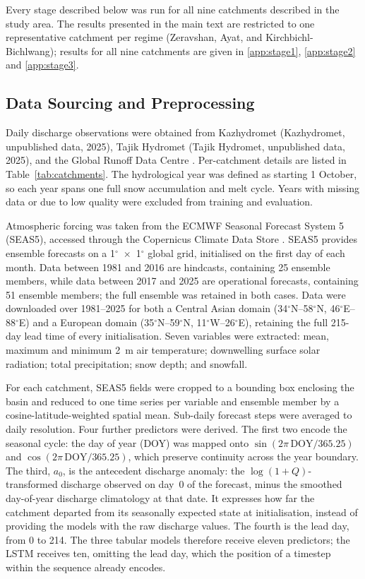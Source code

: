 \documentclass[review,12pt,authoryear]{elsarticle}
\begin{document}
Every stage described below was run for all nine catchments described in the study area. The results presented in the main text are restricted to one representative catchment per regime (Zeravshan, Ayat, and Kirchbichl-Bichlwang); results for all nine catchments are given in \ref{app:stage1}, \ref{app:stage2} and \ref{app:stage3}.

\subsection{Data Sourcing and Preprocessing}

Daily discharge observations were obtained from Kazhydromet (Kazhydromet, unpublished data, 2025), Tajik Hydromet (Tajik Hydromet, unpublished data, 2025), and the Global Runoff Data Centre \citep{grdc2026}. Per-catchment details are listed in Table~\ref{tab:catchments}. The hydrological year was defined as starting 1 October, so each year spans one full snow accumulation and melt cycle. Years with missing data or due to low quality were excluded from training and evaluation.

Atmospheric forcing was taken from the ECMWF Seasonal Forecast System 5 (SEAS5), accessed through the Copernicus Climate Data Store \citep{copernicus2018}. SEAS5 provides ensemble forecasts on a 1$^{\circ}$~$\times$~1$^{\circ}$ global grid, initialised on the first day of each month. Data between 1981 and 2016 are hindcasts, containing 25 ensemble members, while data between 2017 and 2025 are operational forecasts, containing 51 ensemble members; the full ensemble was retained in both cases. Data were downloaded over 1981--2025 for both a Central Asian domain (34$^{\circ}$N--58$^{\circ}$N, 46$^{\circ}$E--88$^{\circ}$E) and a European domain (35$^{\circ}$N--59$^{\circ}$N, 11$^{\circ}$W--26$^{\circ}$E), retaining the full 215-day lead time of every initialisation. Seven variables were extracted: mean, maximum and minimum 2~m air temperature; downwelling surface solar radiation; total precipitation; snow depth; and snowfall. 

For each catchment, SEAS5 fields were cropped to a bounding box enclosing the basin and reduced to one time series per variable and ensemble member by a cosine-latitude-weighted spatial mean. Sub-daily forecast steps were averaged to daily resolution. Four further predictors were derived. The first two encode the seasonal cycle: the day of year (DOY) was mapped onto $\sin(2\pi\,\mathrm{DOY}/365.25)$ and $\cos(2\pi\,\mathrm{DOY}/365.25)$, which preserve continuity across the year boundary. The third, $a_{0}$, is the antecedent discharge anomaly: the $\log(1+Q)$-transformed discharge observed on day~0 of the forecast, minus the smoothed day-of-year discharge climatology at that date. It expresses how far the catchment departed from its seasonally expected state at initialisation, instead of providing the models with the raw discharge values. The fourth is the lead day, from 0 to 214. The three tabular models therefore receive eleven predictors; the LSTM receives ten, omitting the lead day, which the position of a timestep within the sequence already encodes.
\end{document}
